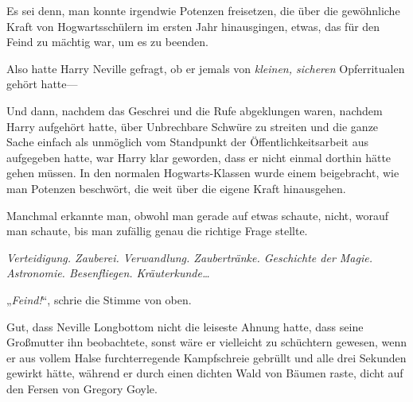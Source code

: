 Es sei denn, man konnte irgendwie Potenzen freisetzen, die über die gewöhnliche Kraft von Hogwartsschülern im ersten Jahr hinausgingen, etwas, das für den Feind zu mächtig war, um es zu beenden.

Also hatte Harry Neville gefragt, ob er jemals von \emph{kleinen, sicheren} Opferritualen gehört hatte—

Und dann, nachdem das Geschrei und die Rufe abgeklungen waren, nachdem Harry aufgehört hatte, über Unbrechbare Schwüre zu streiten und die ganze Sache einfach als unmöglich vom Standpunkt der Öffentlichkeitsarbeit aus aufgegeben hatte, war Harry klar geworden, dass er nicht einmal dorthin hätte gehen müssen. In den normalen Hogwarts-Klassen wurde einem beigebracht, wie man Potenzen beschwört, die weit über die eigene Kraft hinausgehen.

Manchmal erkannte man, obwohl man gerade auf etwas schaute, nicht, worauf man schaute, bis man zufällig genau die richtige Frage stellte.

\emph{Verteidigung. Zauberei. Verwandlung. Zaubertränke. Geschichte der Magie. Astronomie. Besenfliegen. Kräuterkunde…}

„\emph{Feind!}“, schrie die Stimme von oben.

\later

Gut, dass Neville Longbottom nicht die leiseste Ahnung hatte, dass seine Großmutter ihn beobachtete, sonst wäre er vielleicht zu schüchtern gewesen, wenn er aus vollem Halse furchterregende Kampfschreie gebrüllt und alle drei Sekunden  gewirkt hätte, während er durch einen dichten Wald von Bäumen raste, dicht auf den Fersen von Gregory Goyle.

